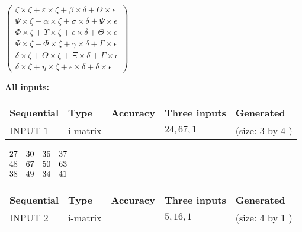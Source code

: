 \documentclass[12pt]{article}
\begin{document}
   
 $   \left( \begin{array}
 {
 c
 }
                    \zeta \times                     \zeta   +  \varepsilon \times                     \zeta   +  \beta \times  \delta   +  \Theta \times  \epsilon \\ 
 \Psi \times                     \zeta   +  \alpha \times                     \zeta   +  \sigma \times  \delta   +  \Psi \times  \epsilon \\ 
 \Phi \times                     \zeta   +  \Upsilon \times                     \zeta   +  \epsilon \times  \delta   +  \Theta \times  \epsilon \\ 
 \Psi \times                     \zeta   +  \Phi \times                     \zeta   +  \gamma \times  \delta   +  \Gamma \times  \epsilon \\ 
 \delta \times                     \zeta   +  \Theta \times                     \zeta   +                     \Xi \times  \delta   +  \Gamma \times  \epsilon \\ 
 \delta \times                     \zeta   +  \eta \times                     \zeta   +  \epsilon \times  \delta   +  \delta \times  \epsilon
 \end{array} \right) $ 
   
   
\noindent\vspace{0.1in}\hspace{-0.08in} {\textbf{\Large{All inputs: }}}
   
   
  
  
\noindent\begin{tabular}{|l|l|l|l|l|}
\hline
 Sequential & Type & Accuracy & Three inputs & Generated \\ 
\hline
 
 
  INPUT $  1 $ & i-matrix &  & $
 24
 , 
 67
 , 
 1
 $ & (size:  3  by  4 )
 \\  \hline  
 \end{tabular}
   
   
 $\begin{array}{
 c
 c
 c
 c
 }
 27  & 
 30  & 
 36  & 
 37  \\ 
 48  & 
 67  & 
 50  & 
 63  \\ 
 38  & 
 49  & 
 34  & 
 41
\end{array}  $ 
  
  
\noindent\begin{tabular}{|l|l|l|l|l|}
\hline
 Sequential & Type & Accuracy & Three inputs & Generated \\ 
\hline
 
 
  INPUT $  2 $ & i-matrix &  & $
 5
 , 
 16
 , 
 1
 $ & (size:  4  by  1 )
 \\  \hline  
 \end{tabular}
   
\end{document}
